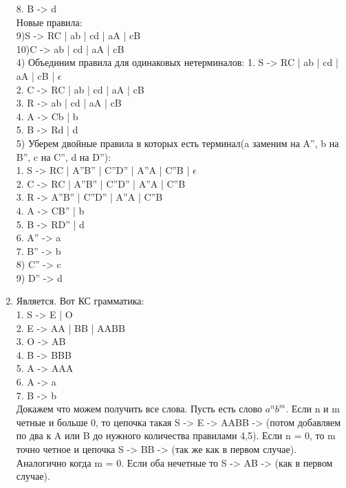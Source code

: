 \documentclass[12pt]{article}
\begin{document}
\begin{enumerate}
		     8. B -> d\\
		     Новые правила:\\
		     9)S -> RC | ab | cd | aA | cB\\
		     10)C -> ab | cd | aA | cB\\
		  4) Объединим правила для одинаковых нетерминалов:
		     1. S -> RC | ab | cd | aA | cB | $\epsilon$\\
		     2. C -> RC | ab | cd | aA | cB \\
		     3. R -> ab | cd | aA | cB\\
		     4. A -> Cb | b\\
		     5. B -> Rd | d\\
		  5) Уберем двойные правила в которых есть терминал(a заменим на A'', b на B'', c на C'', d на D''):\\
	    		1. S -> RC | A''B'' | C''D'' | A''A | C''B | $\epsilon$\\
			    2. C -> RC | A''B'' | C''D'' | A''A | C''B \\
			    3. R -> A''B'' | C''D'' | A''A | C''B\\
			    4. A -> CB'' | b\\
			    5. B -> RD'' | d\\
			    6. A'' -> a\\
			    7. B'' -> b\\
			    8) C'' -> c\\
			    9) D'' -> d\\
	    \item [\bf \textnumero 3]
	    Является. Вот КС грамматика:\\
	      1. S -> E | O\\
	      2. E -> AA | BB | AABB\\
	      3. O -> AB\\
	      4. B -> BBB\\
	      5. A -> AAA\\
	      6. A -> a\\
	      7. B -> b\\
	      Докажем что можем получить все слова. Пусть есть слово $a^nb^m$. Если n и m четные и больше 0, то цепочка такая S -> E -> AABB -> (потом добавляем по два к A или B до нужного количества правилами 4,5). Если n = 0, то m точно четное и цепочка S -> BB -> (так же как в первом случае). Аналогично когда m = 0. Если оба нечетные то S -> AB -> (как в первом случае).
\end{enumerate}
\end{document}
